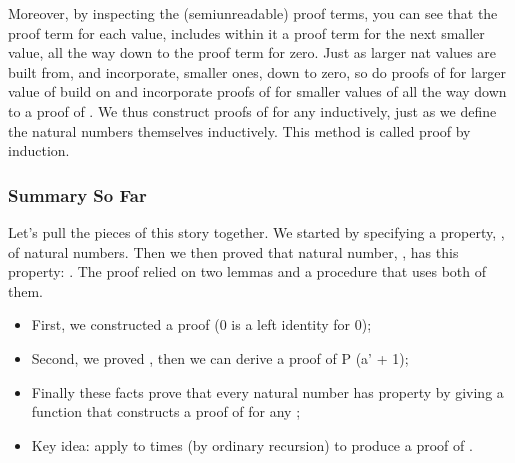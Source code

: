 \documentclass[letterpaper,10pt,english]{sphinxmanual}
\begin{document}
\sphinxAtStartPar
Moreover, by inspecting the (semi\sphinxhyphen{}unreadable) proof terms,
you can see that the proof term for each value,  includes
within it a proof term for the next smaller value, all the way
down to the proof term for zero. Just as larger nat values
are built from, and incorporate, smaller ones, down to zero,
so do proofs of  for larger value of  build on and
incorporate proofs of  for smaller values of  all
the way down to a proof of . We thus construct proofs of
 for any  inductively, just as we define the natural
numbers themselves inductively. This method is called proof
by induction.


\subsubsection{Summary So Far}
\label{\detokenize{A_03_Recursive_Types:summary-so-far}}
\sphinxAtStartPar
Let’s pull the pieces of this story together. We started by
specifying a property, , of natural numbers.
Then we then proved that  natural number, , has this
property: . The proof relied on two lemmas and
a procedure that uses both of them.
\begin{itemize}
\item {} 
\sphinxAtStartPar
First, we constructed a proof  (0 is a left identity for 0);

\item {} 
\sphinxAtStartPar
Second, we proved , then we can derive a proof of P (a’ + 1);

\item {} 
\sphinxAtStartPar
Finally these facts prove that every natural number  has property  by giving a function that constructs a proof of  for any ;

\item {} 
\sphinxAtStartPar
Key idea: apply  to  times (by ordinary recursion) to produce a proof of .

\end{itemize}
\end{document}
